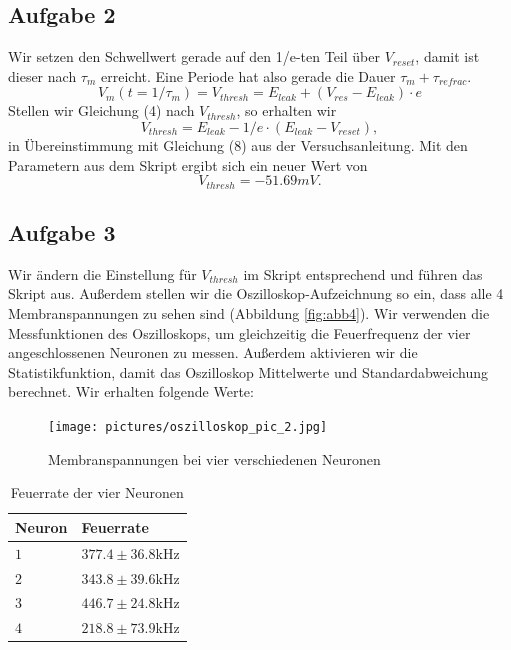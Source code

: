 \documentclass[10pt,a4paper]{scrartcl}
\begin{document}
\subsection{Aufgabe 2}
Wir setzen den Schwellwert gerade auf den 1/e-ten Teil über $V_{reset}$, damit ist dieser nach $\tau_m$ erreicht. Eine Periode hat also gerade die Dauer $\tau_m + \tau_{refrac}$.
\begin{equation}
V_m(t = 1 / \tau_m) = V_{thresh} = E_{leak} + (V_{res}-E_{leak})\cdot e
\end{equation}
Stellen wir Gleichung (4) nach $V_{thresh}$, so erhalten wir
\begin{equation}
V_{thresh} = E_{leak} - 1/e\cdot (E_{leak} - V_{reset}),
\end{equation}
in Übereinstimmung mit Gleichung (8) aus der Versuchsanleitung. Mit den Parametern aus dem Skript ergibt sich ein neuer Wert von 
\begin{equation}
V_{thresh}=-51.69mV.
\end{equation}


\subsection{Aufgabe 3}
Wir ändern die Einstellung für $V_{thresh}$ im Skript entsprechend und führen das Skript aus. Außerdem stellen wir die Oszilloskop-Aufzeichnung so ein, dass alle 4 Membranspannungen zu sehen sind (Abbildung \ref{fig:abb4}). Wir verwenden die Messfunktionen des Oszilloskops, um gleichzeitig die Feuerfrequenz der vier angeschlossenen Neuronen zu messen. Außerdem aktivieren wir die Statistikfunktion, damit das Oszilloskop Mittelwerte und Standardabweichung berechnet. Wir erhalten folgende Werte:

\begin{figure} [ht]
\begin{center}
\label{fig:abb04}
\caption{Membranspannungen bei vier verschiedenen Neuronen}
\texttt{[image: pictures/oszilloskop\_pic\_2.jpg]} 
\end{center}
\end{figure}

\begin{table}[H]
\centering
\captionsetup{justification=centering}
\caption{Feuerrate der vier Neuronen}
\begin{tabular}{l|l}
 Neuron&Feuerrate\\
\hline
$1$&$377.4 \pm 36.8$kHz\\
$2$&$343.8 \pm 39.6$kHz\\
$3$&$446.7 \pm 24.8$kHz\\
$4$&$218.8 \pm 73.9$kHz
\end{tabular}
\label{tab:01}
\end{table}
\end{document}
